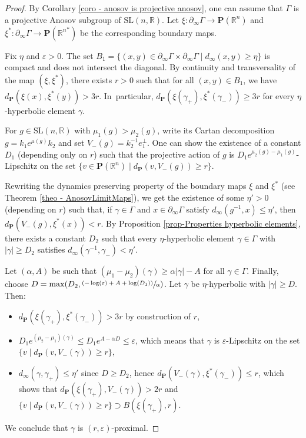 \documentclass[11pt]{article}
\numberwithin{equation}{section}
\newcommand{\psfrac}[2]{\sfrac{(#1)}{#2}}
\theoremstyle{definition}
\newcommand{\proj}{\mathbf{P}}
\newcommand{\R}{\mathbb{R}}
\newcommand{\SL}{\mathrm{SL}}
\let\epsilon\varepsilon
\let\G\Gamma
\let\g\gamma
\begin{document}
\begin{proof}
By Corollary \ref{coro - anosov is projective anosov}, one can assume that $\Gamma$ is a projective Anosov subgroup of $\SL(n,\R)$. Let $\xi:\partial_\infty \Gamma \to \proj(\R^n)$ and $\xi^*: \partial_\infty \Gamma \to \proj({\R^n}^*)$ be the corresponding boundary maps.

Fix $\eta$ and $\epsilon>0$. The set $ B_1 =\{(x,y)\in \partial_\infty \Gamma \times \partial_\infty \Gamma \mid d_\infty(x,y) \geq \eta\}$ is compact and does not intersect the diagonal. By continuity and transversality of the map $(\xi,\xi^*)$, there exists $r>0$ such that for all $(x,y)\in B_1$, we have $d_\proj(\xi(x), \xi^*(y))> 3r$. In~particular, $d_\proj(\xi(\g_+), \xi^*(\g_-)) \geq 3r$ for every $\eta$-hyperbolic element $\g$.

For $g\in \SL(n,\R)$ with $\mu_1(g) > \mu_2(g)$, write its Cartan decomposition $g= k_1 e^{\mu(g)} k_2$ and set $V_-(g) = k_2^{-1}e_1^\perp$. One can show the existence of a constant $D_1$ (depending only on $r$) such that the projective action of $g$ is $D_1 e^{\mu_2(g)-\mu_1(g)}$-Lipschitz on the set $\{v \in \proj(\R^n) \mid d_\proj(v, V_-(g)) \geq r\}$.

Rewriting the dynamics preserving property of the boundary maps $\xi$ and $\xi^*$ (see Theorem \ref{theo - AnosovLimitMaps}), we get the existence of some $\eta'>0$ (depending on $r$) such that, if $\g \in \G$ and $x\in \partial_\infty \G$ satisfy $d_\infty (g^{-1},x)\leq \eta'$, then $d_\proj(V_-(g), \xi^*(x)) < r$. By Proposition \ref{prop-Properties hyperbolic elements}, there exists a constant $D_2$ such that every $\eta$-hyperbolic element $\gamma \in \Gamma$ with $\vert \gamma \vert \geq D_2$ satisfies $d_\infty(\gamma^{-1},\gamma_-) <\eta'$.

Let $(\alpha, A)$ be such that $(\mu_1-\mu_2)(\g)\geq \alpha \vert \g \vert -A$ for all $\g\in\G$. Finally, choose $D = \max(D_2,\psfrac{-\log(\epsilon)+A+\log(D_1)}{\alpha})$. Let $\gamma$ be $\eta$-hyperbolic with $\vert \gamma \vert \geq D$. Then:
\begin{itemize}
\item $d_\proj(\xi(\gamma_+),\xi^*(\gamma_-)) > 3r$ by construction of $r$,

\item $D_1 e^{(\mu_2-\mu_1)(\gamma)} \leq D_1 e^{A-\alpha D}\leq \epsilon$, which means that $\gamma$ is $\epsilon$-Lipschitz on the set $\{v\mid d_\proj (v, V_-(\gamma))\geq r\},$
\item $d_\infty(\gamma, \gamma_+) \leq \eta'$ since $D\geq D_2$, hence $d_\proj(V_-(\gamma), \xi^*(\gamma_-)) \leq r$, which shows that $d_\proj(\xi(\gamma_+), V_-(\gamma))>2r$ and $\{v\mid d_\proj(v, V_-(\g))\geq r\} \supset B(\xi(\gamma_+),r)$.
\end{itemize}
We conclude that $\gamma$ is $(r,\epsilon)$-proximal.


\end{proof}
\end{document}
